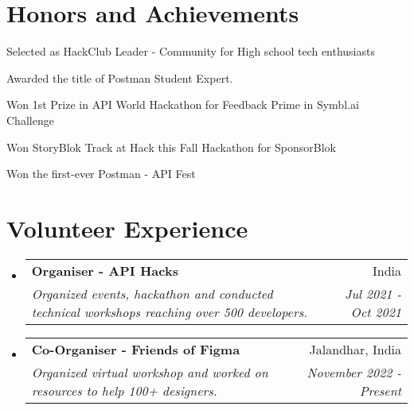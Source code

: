 \documentclass[a4paper,20pt]{article}
\makeatletter
\newcommand{\resumeSubheading}[4]{
  \vspace{-1pt}\item
    \begin{tabular*}{0.97\textwidth}{l@{\extracolsep{\fill}}r}
      \textbf{#1} & #2 \\
      \textit{#3} & \textit{#4} \\
    \end{tabular*}\vspace{-5pt}
}
\newcommand{\resumeSubHeadingListStart}{\begin{itemize}[leftmargin=*]}
\newcommand{\resumeSubHeadingListEnd}{\end{itemize}}
\makeatother
\begin{document}
\section{Honors and Achievements}
\begin{description}[font=$\bullet$]
\item {Selected as HackClub Leader - Community for High school tech enthusiasts}
\vspace{-5pt}
\item {Awarded the title of Postman Student Expert.}
\vspace{-5pt}
\item {Won 1st Prize in API World Hackathon for Feedback Prime in Symbl.ai Challenge}
\vspace{-5pt}
\item {Won StoryBlok Track at Hack this Fall Hackathon for SponsorBlok}
\vspace{-5pt}
\item {Won the first-ever Postman - API Fest}
\end{description}

\vspace{-5pt}
\section{Volunteer Experience}
  \resumeSubHeadingListStart
	\resumeSubheading
    {Organiser - API Hacks}{India}
    {Organized events, hackathon and conducted technical workshops reaching over 500 developers.}{Jul 2021 - Oct 2021}
\vspace{5pt}
    \resumeSubheading
    {Co-Organiser - Friends of Figma}{Jalandhar, India}
    {Organized virtual workshop and worked on resources to help 100+ designers.}{November 2022 - Present}

\resumeSubHeadingListEnd
\end{document}
